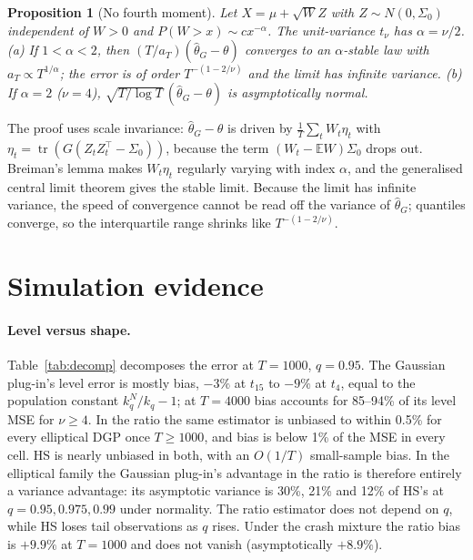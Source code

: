 \documentclass[11pt]{article}
\newcommand{\E}{\mathbb{E}}
\newcommand{\tr}{\operatorname{tr}}
\newtheorem{proposition}{Proposition}
\theoremstyle{remark}
\begin{document}
\begin{proposition}[No fourth moment]\label{prop:stable}
Let $X=\mu+\sqrt W Z$ with $Z\sim N(0,\Sigma_0)$ independent of $W>0$ and $P(W>x)\sim cx^{-\alpha}$. The unit-variance
$t_\nu$ has $\alpha=\nu/2$. (a) If $1<\alpha<2$, then $(T/a_T)(\hat\theta_G-\theta)$ converges to an
$\alpha$-stable law with $a_T\propto T^{1/\alpha}$; the error is of order $T^{-(1-2/\nu)}$ and the limit has
infinite variance. (b) If $\alpha=2$ ($\nu=4$), $\sqrt{T/\log T}\,(\hat\theta_G-\theta)$ is asymptotically
normal.
\end{proposition}

The proof uses scale invariance: $\hat\theta_G-\theta$ is driven by $\frac1T\sum_tW_t\eta_t$ with
$\eta_t=\tr(G(Z_tZ_t^\top-\Sigma_0))$, because the term $(W_t-\E W)\Sigma_0$ drops out. Breiman's lemma makes
$W_t\eta_t$ regularly varying with index $\alpha$, and the generalised central limit theorem gives the stable
limit. Because the limit has infinite variance, the speed of convergence cannot be read off the variance of
$\hat\theta_G$; quantiles converge, so the interquartile range shrinks like $T^{-(1-2/\nu)}$.

\section{Simulation evidence}\label{sec:sim}

\paragraph{Level versus shape.}
Table~\ref{tab:decomp} decomposes the error at $T=1000$, $q=0.95$. The Gaussian plug-in's level error is mostly
bias, $-3\%$ at $t_{15}$ to $-9\%$ at $t_4$, equal to the population constant $k^N_q/k_q-1$; at $T=4000$ bias
accounts for 85--94\% of its level MSE for $\nu\ge4$. In the ratio the same estimator is unbiased to within
0.5\% for every elliptical DGP once $T\ge1000$, and bias is below 1\% of the MSE in every cell. HS is nearly
unbiased in both, with an $O(1/T)$ small-sample bias. In the elliptical family the Gaussian plug-in's
advantage in the ratio is therefore entirely a variance advantage: its asymptotic variance is 30\%, 21\% and
12\% of HS's at $q=0.95,0.975,0.99$ under normality. The ratio estimator does not depend on $q$, while HS loses
tail observations as $q$ rises. Under the crash mixture the ratio bias is $+9.9\%$ at $T=1000$ and does not vanish (asymptotically $+8.9\%$).
\end{document}
